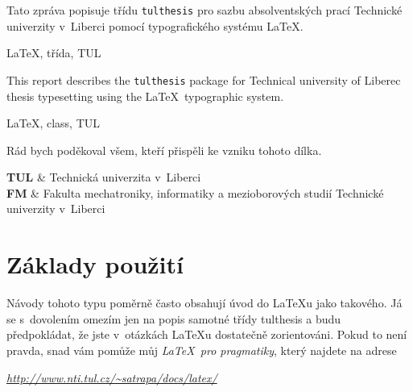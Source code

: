\documentclass[FM,BP]{tulthesis}
\newcommand{\argument}[1]{{\ttfamily\color{\tulcolor}#1}}
\newenvironment{myquote}{\begin{list}{}{\setlength\leftmargin\parindent}\item[]}{\end{list}}
\begin{document}

\begin{abstractCZ}
Tato zpráva popisuje třídu \texttt{tulthesis} pro sazbu absolventských prací
Technické univerzity v~Liberci pomocí typografického systému \LaTeX.
\end{abstractCZ}

\begin{keywordsCZ}
\LaTeX, třída, TUL
\end{keywordsCZ}

\vspace{2cm}

\begin{abstractEN}
This report describes the \texttt{tulthesis} package for Technical university of
Liberec thesis typesetting using the \LaTeX\ typographic system.
\end{abstractEN}

\begin{keywordsEN}
\LaTeX, class, TUL
\end{keywordsEN}

\clearpage

\begin{acknowledgement}
Rád bych poděkoval všem, kteří přispěli ke vzniku tohoto dílka.
\end{acknowledgement}

\tableofcontents

\clearpage

\begin{abbrList}
\textbf{TUL} & Technická univerzita v~Liberci \\
\textbf{FM} & Fakulta mechatroniky, informatiky a mezioborových studií
Technické univerzity v~Liberci
\end{abbrList}

\chapter{Základy použití}

Návody tohoto typu poměrně často obsahují úvod do \LaTeX u jako takového. Já se
s~dovolením omezím jen na popis samotné třídy \argument{tulthesis} a budu
předpokládat, že jste v~otázkách \LaTeX u dostatečně zorientováni. Pokud
to není pravda, snad vám pomůže můj \emph{\LaTeX\ pro pragmatiky}, který
najdete na adrese

\begin{myquote}
\href{http://www.nti.tul.cz/~satrapa/docs/latex/}{\emph{http://www.nti.tul.cz/\textasciitilde satrapa/docs/latex/}}
\end{myquote}
\end{document}
